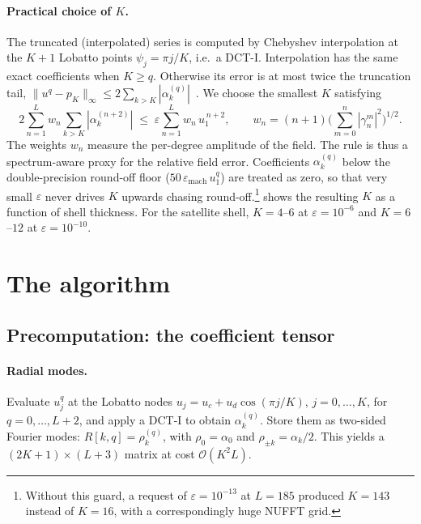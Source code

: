 \documentclass[11pt,a4paper]{article}
\theoremstyle{remark}
\newcommand{\eps}{\varepsilon}
\newcommand{\Oh}{\mathcal{O}}
\begin{document}
\paragraph{Practical choice of $K$.}
The truncated (interpolated) series is computed by Chebyshev interpolation at the $K+1$
Lobatto points $\psi_j=\pi j/K$, i.e.\ a DCT-I. Interpolation has the same exact coefficients
when $K\ge q$. Otherwise its error is at most twice the truncation tail,
$\|u^q-p_K\|_\infty\le2\sum_{k>K}|\alpha_k^{(q)}|$~\cite[Thm.~4.2]{trefethen2013}. We
choose the smallest $K$ satisfying
\begin{equation}\label{eq:Kchoice}
2\sum_{n=1}^{L}w_n\sum_{k>K}|\alpha_k^{(n+2)}|\;\le\;\eps\sum_{n=1}^{L}w_n\,u_1^{\,n+2},
\qquad w_n=(n+1)\Big(\sum_{m=0}^{n}|\gamma_n^m|^2\Big)^{1/2}.
\end{equation}
The weights $w_n$ measure the per-degree amplitude of the field. The rule is thus a
spectrum-aware proxy for the relative field error. Coefficients $\alpha_k^{(q)}$ below the
double-precision round-off floor ($50\,\eps_{\text{mach}}\,u_1^q$) are treated as zero, so that
very small $\eps$ never drives $K$ upwards chasing round-off.\footnote{Without this guard, a
request of $\eps=10^{-13}$ at $L=185$ produced $K=143$ instead of $K=16$, with a correspondingly
huge NUFFT grid.}  shows the resulting $K$ as a function of shell thickness. For
the satellite shell, $K=4$--$6$ at $\eps=10^{-6}$ and $K=6$--$12$ at $\eps=10^{-10}$.

\section{The algorithm}\label{sec:algorithm}

\subsection{Precomputation: the coefficient tensor}

\paragraph{Radial modes.} Evaluate $u_j^{q}$ at the Lobatto nodes $u_j=u_c+u_d\cos(\pi j/K)$,
$j=0,\dots,K$, for $q=0,\dots,L+2$, and apply a DCT-I to obtain $\alpha_k^{(q)}$. Store them as
two-sided Fourier modes: $R[k,q]=\rho_k^{(q)}$, with $\rho_0=\alpha_0$ and
$\rho_{\pm k}=\alpha_k/2$. This yields a $(2K+1)\times(L+3)$ matrix at cost $\Oh(K^2L)$.
\end{document}
